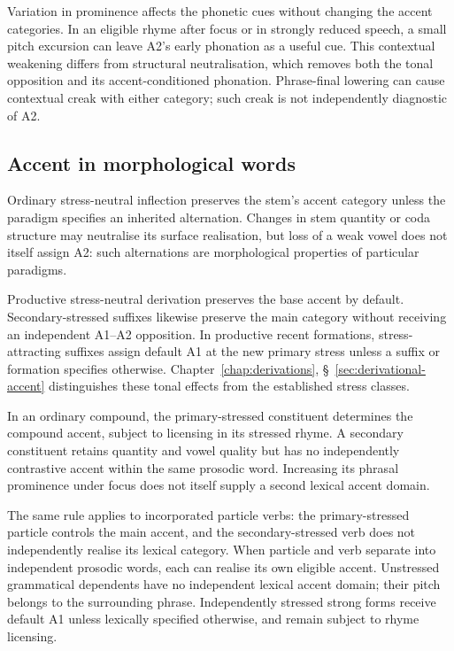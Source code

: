 Variation in prominence affects the phonetic cues without changing the accent categories. In an eligible rhyme after focus or in strongly reduced speech, a small pitch excursion can leave A2's early phonation as a useful cue. This contextual weakening differs from structural neutralisation, which removes both the tonal opposition and its accent-conditioned phonation. Phrase-final lowering can cause contextual creak with either category; such creak is not independently diagnostic of A2.

\subsection{Accent in morphological words}
\label{sec:accent-morphology}

Ordinary stress-neutral inflection preserves the stem's accent category unless the paradigm specifies an inherited alternation. Changes in stem quantity or coda structure may neutralise its surface realisation, but loss of a weak vowel does not itself assign A2: such alternations are morphological properties of particular paradigms.

Productive stress-neutral derivation preserves the base accent by default. Secondary-stressed suffixes likewise preserve the main category without receiving an independent A1--A2 opposition. In productive recent formations, stress-attracting suffixes assign default A1 at the new primary stress unless a suffix or formation specifies otherwise. Chapter~\ref{chap:derivations}, \S~\ref{sec:derivational-accent} distinguishes these tonal effects from the established stress classes.

In an ordinary compound, the primary-stressed constituent determines the compound accent, subject to licensing in its stressed rhyme. A secondary constituent retains quantity and vowel quality but has no independently contrastive accent within the same prosodic word. Increasing its phrasal prominence under focus does not itself supply a second lexical accent domain.

The same rule applies to incorporated particle verbs: the primary-stressed particle controls the main accent, and the secondary-stressed verb does not independently realise its lexical category. When particle and verb separate into independent prosodic words, each can realise its own eligible accent. Unstressed grammatical dependents have no independent lexical accent domain; their pitch belongs to the surrounding phrase. Independently stressed strong forms receive default A1 unless lexically specified otherwise, and remain subject to rhyme licensing.

